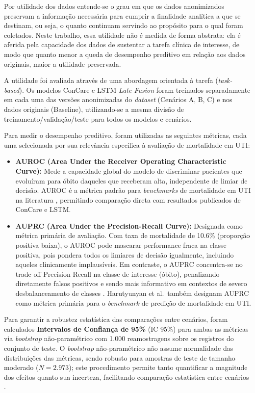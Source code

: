 Por utilidade dos dados entende-se o grau em que os dados anonimizados preservam a informação necessária para cumprir a finalidade analítica a que se destinam, ou seja, o quanto continuam servindo ao propósito para o qual foram coletados. Neste trabalho, essa utilidade não é medida de forma abstrata: ela é aferida pela capacidade dos dados de sustentar a tarefa clínica de interesse, de modo que quanto menor a queda de desempenho preditivo em relação aos dados originais, maior a utilidade preservada.

A utilidade foi avaliada através de uma abordagem orientada à tarefa (\textit{task-based}). Os modelos ConCare e LSTM \textit{Late Fusion} foram treinados separadamente em cada uma das versões anonimizadas do \textit{dataset} (Cenários A, B, C) e nos dados originais (Baseline), utilizando-se a mesma divisão de treinamento/validação/teste para todos os modelos e cenários.

Para medir o desempenho preditivo, foram utilizadas as seguintes métricas, cada uma selecionada por sua relevância específica à avaliação de mortalidade em UTI:

\begin{itemize}
    \item \textbf{AUROC (Area Under the Receiver Operating Characteristic Curve):} Mede a capacidade global do modelo de discriminar pacientes que evoluíram para óbito daqueles que receberam alta, independente de limiar de decisão. AUROC é a métrica padrão para \textit{benchmarks} de mortalidade em UTI na literatura \cite{Harutyunyan2019, Liu2025, Roosli2022}, permitindo comparação direta com resultados publicados de ConCare e LSTM.

    \item \textbf{AUPRC (Area Under the Precision-Recall Curve):} Designada como métrica primária de avaliação. Com taxa de mortalidade de 10.6\% (proporção positiva baixa), o AUROC pode mascarar performance fraca na classe positiva, pois pondera todos os limiares de decisão igualmente, incluindo aqueles clinicamente implausíveis. Em contraste, o AUPRC concentra-se no trade-off Precision-Recall na classe de interesse (óbito), penalizando diretamente falsos positivos e sendo mais informativo em contextos de severo desbalanceamento de classes \cite{Harutyunyan2019}. Harutyunyan et al.\ também designam AUPRC como métrica primária para o \textit{benchmark} de predição de mortalidade em UTI.
\end{itemize}

Para garantir a robustez estatística das comparações entre cenários, foram calculados \textbf{Intervalos de Confiança de 95\%} (IC 95\%) para ambas as métricas via \textit{bootstrap} não-paramétrico com 1.000 reamostragens sobre os registros do conjunto de teste. O \textit{bootstrap} não-paramétrico não assume normalidade das distribuições das métricas, sendo robusto para amostras de teste de tamanho moderado ($N=2.973$); este procedimento permite tanto quantificar a magnitude dos efeitos quanto sua incerteza, facilitando comparação estatística entre cenários \cite{Pilgram2024}.

